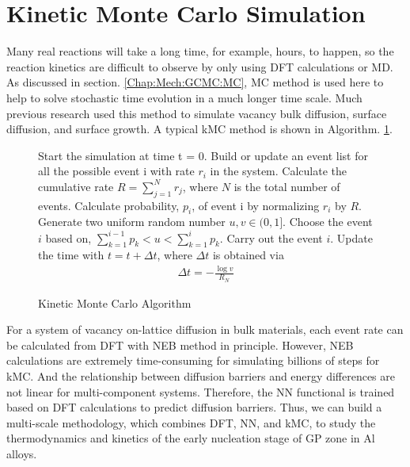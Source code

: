 \section{Kinetic Monte Carlo Simulation}
\label{chap:meth:KMC}

Many real reactions will take a long time, for example, hours, to happen, so the reaction kinetics are difficult to observe by only using \ac{DFT} calculations or \ac{MD}. As discussed in section. \ref{Chap:Mech:GCMC:MC}, \ac{MC} method is used here to help to solve stochastic time evolution in a much longer time scale. Much previous research used this method to simulate vacancy bulk diffusion, surface diffusion, and surface growth. \cite{frenkel2001understanding, leach2001molecular} A typical \ac{kMC} method is shown in Algorithm. \ref{algo:kMC}.

\begin{figure}[htb]
\centering
\begin{minipage}{.7\linewidth}
\begin{algorithm}[H]
  \caption{Kinetic Monte Carlo Algorithm}\label{algo:kMC}
  \begin{algorithmic}[1]
    \State Start the simulation at time t = 0.
        \State Build or update an event list for all the possible event i with rate $r_i$ in the system.
        \State Calculate the cumulative rate $R = \sum_{j=1}^N r_j$,
            where $N$ is the total number of events. 
        \State Calculate probability, $p_i$, of event i by normalizing $r_i$ by $R$.
        \State Generate two uniform random number $u, v \in (0, 1]$.
        \State Choose the event $i$ based on,
               $\sum_{k=1}^{i-1} p_k < u < \sum_{k=1}^{i} p_k$.
        \State Carry out the event $i$.
        \State Update the time with $t = t + \Delta t$,
            where $\Delta t$ is obtained via
            \begin{align}
                \Delta t = - \frac{\log{v}}{R_N}
            \label{Chap:Meth:eq:KMC:1}
            \end{align}
    \EndWhile
\end{algorithmic}
\end{algorithm}
\end{minipage}
\end{figure}

For a system of vacancy on-lattice diffusion in bulk materials, each event rate can be calculated from \ac{DFT} with \ac{NEB} method in principle. However, \ac{NEB} calculations are extremely time-consuming for simulating billions of steps for \ac{kMC}. And the relationship between diffusion barriers and energy differences are not linear for multi-component systems. Therefore, the \ac{NN} functional is trained based on \ac{DFT} calculations to predict diffusion barriers. Thus, we can build a multi-scale methodology, which combines \ac{DFT}, \ac{NN}, and \ac{kMC}, to study the thermodynamics and kinetics of the early nucleation stage of GP zone in Al alloys.
